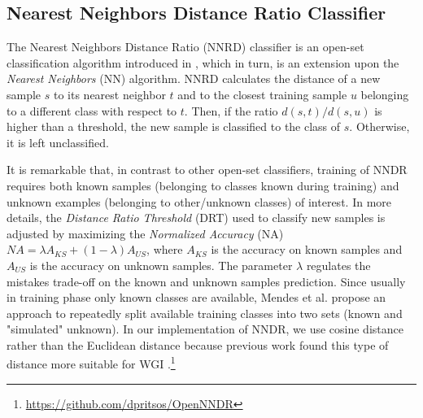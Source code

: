 
\subsection{Nearest Neighbors Distance Ratio Classifier}\label{sec:NNRD_Description}

The Nearest Neighbors Distance Ratio (NNRD) classifier is an open-set classification algorithm introduced in \cite{mendesjunior2016}, which in turn, is an extension upon the \textit{Nearest Neighbors} (NN) algorithm. NNRD calculates the distance of a new sample $s$ to its nearest neighbor $t$ and to the closest training sample $u$ belonging to a different class with respect to $t$. Then, if the ratio $d(s,t)/d(s,u)$ is higher than a threshold, the new sample is classified to the class of $s$. Otherwise, it is left unclassified. 

It is remarkable that, in contrast to other open-set classifiers, training of NNDR requires both known samples (belonging to classes known during training) and unknown examples (belonging to other/unknown classes) of interest. In more details, the \textit{Distance Ratio Threshold} (DRT) used to classify new samples is adjusted by maximizing the \textit{Normalized Accuracy} (NA)  $NA = \lambda A_{KS} + (1 - \lambda) A_{US}$, where $A_{KS}$ is the accuracy on known samples and $A_{US}$ is the accuracy on unknown samples. The parameter $\lambda$ regulates the mistakes trade-off on the known and unknown samples prediction. Since usually in training phase only known classes are available, Mendes et al. \cite{mendesjunior2016} propose an approach to repeatedly split available training classes into two sets (known and "simulated" unknown). In our implementation of NNDR, we use cosine distance rather than the Euclidean distance because previous work found this type of distance more suitable for WGI \cite{pritsos2018open}.\footnote{\url{https://github.com/dpritsos/OpenNNDR}}

